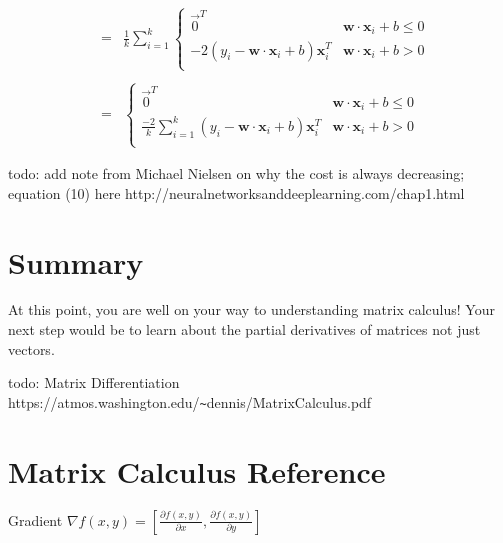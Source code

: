 \documentclass[11pt]{article}
\begin{document}
\[\begin{array}{ccl}
 & = & \frac{1}{k} \sum_{i=1}^k \begin{cases}
	\vec{0}^T & \mathbf{w} \cdot \mathbf{x}_i + b \leq 0\\
	-2(y_i-\mathbf{w}\cdot\mathbf{x}_i+b)\mathbf{x}_i^T & \mathbf{w} \cdot \mathbf{x}_i + b > 0\\
\end{cases}\\\\
 & = & \begin{cases}
	\vec{0}^T & \mathbf{w} \cdot \mathbf{x}_i + b \leq 0\\
	\frac{-2}{k} \sum_{i=1}^k (y_i-\mathbf{w}\cdot\mathbf{x}_i+b)\mathbf{x}_i^T & \mathbf{w} \cdot \mathbf{x}_i + b > 0\\
\end{cases}
\end{array}
\]

todo: add note from Michael Nielsen on why the cost is always decreasing; equation (10) here http://neuralnetworksanddeeplearning.com/chap1.html

\section{Summary}

At this point, you are well on your way to understanding matrix calculus!  Your next step would be to learn about the partial derivatives of matrices not just vectors.

todo: Matrix Differentiation https://atmos.washington.edu/\verb|~|dennis/MatrixCalculus.pdf

\section{Matrix Calculus Reference}

Gradient $\nabla f(x,y)  = [ \frac{\partial f(x,y)}{\partial x}, \frac{\partial f(x,y)}{\partial y}]$
\end{document}
